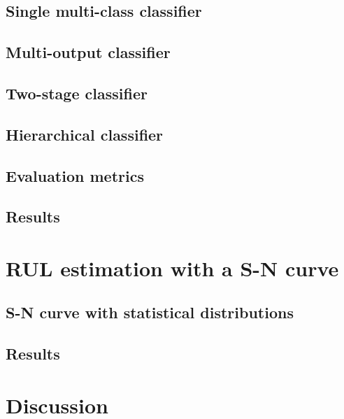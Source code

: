 \subsection{Single multi-class classifier}
\subsection{Multi-output classifier}
\subsection{Two-stage classifier}
\subsection{Hierarchical classifier}
\subsection{Evaluation metrics}
\subsection{Results}
\section{RUL estimation with a S-N curve}
\subsection{S-N curve with statistical distributions}
\subsection{Results}
\section{Discussion}